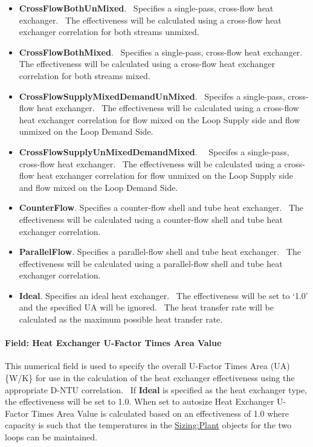 \begin{itemize}
\item
  \textbf{CrossFlowBothUnMixed}.~ Specifies a single-pass, cross-flow heat exchanger.~ The effectiveness will be calculated using a cross-flow heat exchanger correlation for both streams unmixed.
\item
  \textbf{CrossFlowBothMixed}.~ Specifies a single-pass, cross-flow heat exchanger. The effectiveness will be calculated using a cross-flow heat exchanger correlation for both streams mixed.
\item
  \textbf{CrossFlowSupplyMixedDemandUnMixed}.~ Specifes a single-pass, cross-flow heat exchanger.~ The effectiveness will be calculated using a cross-flow heat exchanger correlation for flow mixed on the Loop Supply side and flow unmixed on the Loop Demand Side.
\item
  \textbf{CrossFlowSupplyUnMixedDemandMixed}.~~ Specifes a single-pass, cross-flow heat exchanger.~ The effectiveness will be calculated using a cross-flow heat exchanger correlation for flow unmixed on the Loop Supply side and flow mixed on the Loop Demand Side.
\item
  \textbf{CounterFlow}. Specifies a counter-flow shell and tube heat exchanger.~ The effectiveness will be calculated using a counter-flow shell and tube heat exchanger correlation.
\item
  \textbf{ParallelFlow}. Specifies a parallel-flow shell and tube heat exchanger.~ The effectiveness will be calculated using a parallel-flow shell and tube heat exchanger correlation.
\item
  \textbf{Ideal}. Specifies an ideal heat exchanger.~ The effectiveness will be set to `1.0' and the specified UA will be ignored.~ The heat transfer rate will be calculated as the maximum possible heat transfer rate.
\end{itemize}

\paragraph{Field: Heat Exchanger U-Factor Times Area Value}\label{field-heat-exchanger-u-factor-times-area-value}

This numerical field is used to specify the overall U-Factor Times Area (UA) \{W/K\} for use in the calculation of the heat exchanger effectiveness using the appropriate D-NTU correlation.~ If \textbf{Ideal} is specified as the heat exchanger type, the effectiveness will be set to 1.0. When set to autosize Heat Exchanger U-Factor Times Area Value is calculated based on an effectiveness of 1.0 where capacity is such that the temperatures in the \hyperref[sizingplant]{Sizing:Plant} objects for the two loops can be maintained.

